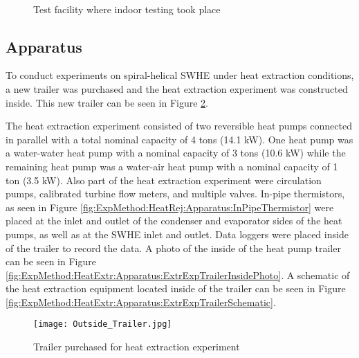 	\begin{figure}
		\centering
		\,
		\caption[Indoor test facility]{Test facility where indoor testing took place}
		\label{fig:ExpMethod:HeatRej:Facility:ERL}
	\end{figure}


	\subsection{Apparatus}
	\label{subsec:ExpMethod:HeatExtr:Apparatus}

To conduct experiments on spiral-helical SWHE under heat extraction conditions, a new trailer was purchased and the heat extraction experiment was constructed inside. This new trailer can be seen in Figure \ref{fig:ExpMethod:HeatExtr:Apparatus:ExtrExpTrailerOutsidePhoto}.

The heat extraction experiment consisted of two reversible heat pumps connected in parallel with a total nominal capacity of 4 tons (14.1 kW). One heat pump was a water-water heat pump with a nominal capacity of 3 tons (10.6 kW) while the remaining heat pump was a water-air heat pump with a nominal capacity of 1 ton (3.5 kW). Also part of the heat extraction experiment were circulation pumps, calibrated turbine flow meters, and multiple valves. In-pipe thermistors, as seen in Figure \ref{fig:ExpMethod:HeatRej:Apparatus:InPipeThermistor}  were placed at the inlet and outlet of the condenser and evaporator sides of the heat pumps, as well as at the SWHE inlet and outlet. Data loggers were placed inside of the trailer to record the data. A photo of the inside of the heat pump trailer can be seen in Figure \ref{fig:ExpMethod:HeatExtr:Apparatus:ExtrExpTrailerInsidePhoto}. A schematic of the heat extraction equipment located inside of the trailer can be seen in Figure \ref{fig:ExpMethod:HeatExtr:Apparatus:ExtrExpTrailerSchematic}.

	\begin{figure}
		\centering
		\texttt{[image: Outside\_Trailer.jpg]}
		\caption[Heat extraction experiment trailer]{Trailer purchased for heat extraction experiment}
		\label{fig:ExpMethod:HeatExtr:Apparatus:ExtrExpTrailerOutsidePhoto}
	\end{figure}

